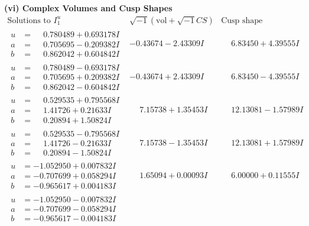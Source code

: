 \documentclass[1p]{elsarticle_modified}
\theoremstyle{definition}
\newcommand{\I}{\sqrt{-1}}
\begin{document}
\newpage\flushleft \textbf{(vi) Complex Volumes and Cusp Shapes}
$$\begin{array}{c|c|c}  
\text{Solutions to }I^u_{1}& \I (\text{vol} + \sqrt{-1}CS) & \text{Cusp shape}\\
 \hline 
\begin{aligned}
u &= \phantom{-}0.780489 + 0.693178 I \\
a &= \phantom{-}0.705695 - 0.209382 I \\
b &= \phantom{-}0.862042 + 0.604842 I\end{aligned}
 & -0.43674 - 2.43309 I & \phantom{-}6.83450 + 4.39555 I \\ \hline\begin{aligned}
u &= \phantom{-}0.780489 - 0.693178 I \\
a &= \phantom{-}0.705695 + 0.209382 I \\
b &= \phantom{-}0.862042 - 0.604842 I\end{aligned}
 & -0.43674 + 2.43309 I & \phantom{-}6.83450 - 4.39555 I \\ \hline\begin{aligned}
u &= \phantom{-}0.529535 + 0.795568 I \\
a &= \phantom{-}1.41726 + 0.21633 I \\
b &= \phantom{-}0.20894 + 1.50824 I\end{aligned}
 & \phantom{-}7.15738 + 1.35453 I & \phantom{-}12.13081 - 1.57989 I \\ \hline\begin{aligned}
u &= \phantom{-}0.529535 - 0.795568 I \\
a &= \phantom{-}1.41726 - 0.21633 I \\
b &= \phantom{-}0.20894 - 1.50824 I\end{aligned}
 & \phantom{-}7.15738 - 1.35453 I & \phantom{-}12.13081 + 1.57989 I \\ \hline\begin{aligned}
u &= -1.052950 + 0.007832 I \\
a &= -0.707699 + 0.058294 I \\
b &= -0.965617 + 0.004183 I\end{aligned}
 & \phantom{-}1.65094 + 0.00093 I & \phantom{-}6.00000 + 0.11555 I \\ \hline\begin{aligned}
u &= -1.052950 - 0.007832 I \\
a &= -0.707699 - 0.058294 I \\
b &= -0.965617 - 0.004183 I\end{aligned}

\end{array}$$
\end{document}
